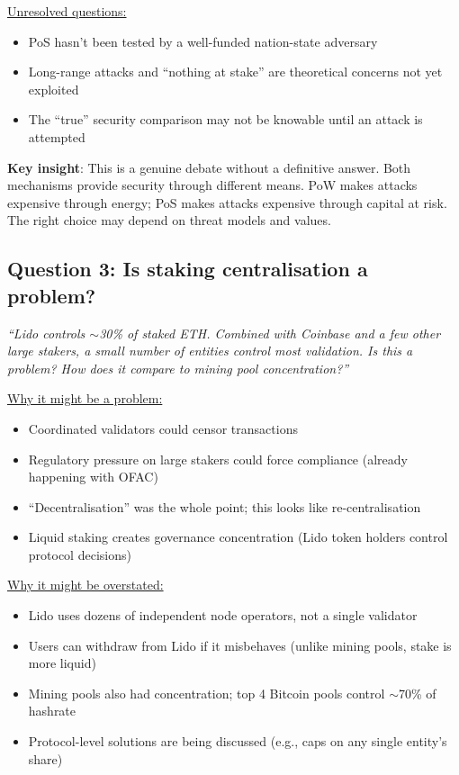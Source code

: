 \documentclass[11pt]{article}
\begin{document}
\medskip
\noindent\underline{Unresolved questions:}
\begin{itemize}[leftmargin=*]
\item PoS hasn't been tested by a well-funded nation-state adversary
\item Long-range attacks and ``nothing at stake'' are theoretical concerns not yet exploited
\item The ``true'' security comparison may not be knowable until an attack is attempted
\end{itemize}

\medskip
\noindent\textbf{Key insight}: This is a genuine debate without a definitive answer. Both mechanisms provide security through different means. PoW makes attacks expensive through energy; PoS makes attacks expensive through capital at risk. The right choice may depend on threat models and values.

\subsection*{Question 3: Is staking centralisation a problem?}

\textit{``Lido controls $\sim$30\% of staked ETH. Combined with Coinbase and a few other large stakers, a small number of entities control most validation. Is this a problem? How does it compare to mining pool concentration?''}

\medskip
\noindent\underline{Why it might be a problem:}
\begin{itemize}[leftmargin=*]
\item Coordinated validators could censor transactions
\item Regulatory pressure on large stakers could force compliance (already happening with OFAC)
\item ``Decentralisation'' was the whole point; this looks like re-centralisation
\item Liquid staking creates governance concentration (Lido token holders control protocol decisions)
\end{itemize}

\medskip
\noindent\underline{Why it might be overstated:}
\begin{itemize}[leftmargin=*]
\item Lido uses dozens of independent node operators, not a single validator
\item Users can withdraw from Lido if it misbehaves (unlike mining pools, stake is more liquid)
\item Mining pools also had concentration; top 4 Bitcoin pools control $\sim$70\% of hashrate
\item Protocol-level solutions are being discussed (e.g., caps on any single entity's share)
\end{itemize}
\end{document}
